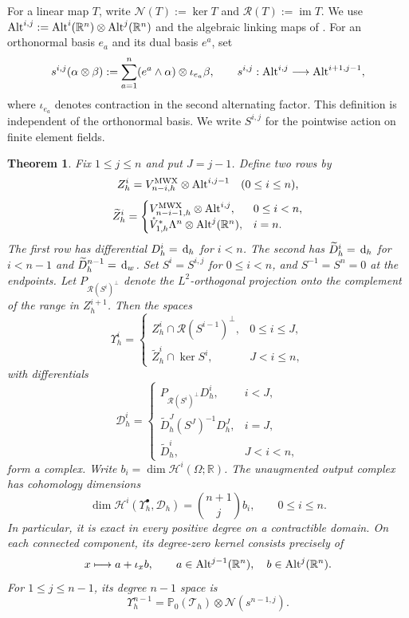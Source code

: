 \documentclass[10pt]{amsart}
\numberwithin{equation}{section}
\newtheorem{theorem}{Theorem}[section]
\newcommand{\dd}{\,{\rm d}}
\begin{document}
For a linear map $T$, write $\mathcal N(T):=\ker T$ and
$\mathcal R(T):=\operatorname{im}T$.
We use ${\rm Alt}^{i,j}:={\rm Alt}^i(\mathbb R^n)\otimes{\rm Alt}^j(\mathbb R^n)$ and the algebraic linking maps of \cite{ArnoldHu2021}.
For an orthonormal basis $e_a$ and its dual basis $e^a$, set
\[
s^{i,j}(\alpha\otimes\beta)
:=\sum_{a=1}^n(e^a\wedge\alpha)\otimes\iota_{e_a}\beta,
\qquad
s^{i,j}:{\rm Alt}^{i,j}\longrightarrow{\rm Alt}^{i+1,j-1},
\]
where $\iota_{e_a}$ denotes contraction in the second alternating factor.
This definition is independent of the orthonormal basis. We write $S^{i,j}$ for the pointwise action on finite element fields.

\begin{theorem}\label{thm:fullBGG}
Fix $1\leq j\leq n$ and put $J=j-1$. Define two rows by
\[
Z_h^i=V_{n-i,h}^{\rm MWX}\otimes{\rm Alt}^{i,j-1}
\quad(0\leq i\leq n),
\]
\[
\widetilde Z_h^i=
\begin{cases}
V_{n-i-1,h}^{\rm MWX}\otimes{\rm Alt}^{i,j},&0\leq i<n,\\
\mathring V_{1,h}^{*}\Lambda^n\otimes{\rm Alt}^j(\mathbb R^n),&i=n.
\end{cases}
\]
The first row has differential $D_h^i=\dd_h$ for $i<n$.
The second has $\widetilde D_h^i=\dd_h$ for $i<n-1$ and $\widetilde D_h^{n-1}=\dd_w$.
Set $S^i=S^{i,j}$ for $0\leq i<n$, and $S^{-1}=S^n=0$ at the endpoints.
Let $P_{\mathcal R(S^i)^\perp}$ denote the $L^2$-orthogonal projection onto the complement of the range in $Z_h^{i+1}$.
Then the spaces
\[
\Upsilon_h^i=
\begin{cases}
Z_h^i\cap\mathcal R(S^{i-1})^\perp,&0\leq i\leq J,\\
\widetilde Z_h^i\cap\ker S^i,&J<i\leq n,
\end{cases}
\]
with differentials
\[
\mathcal D_h^i=
\begin{cases}
P_{\mathcal R(S^i)^\perp}D_h^i,&i<J,\\
\widetilde D_h^J(S^J)^{-1}D_h^J,&i=J,\\
\widetilde D_h^i,&J<i<n,
\end{cases}
\]
form a complex. Write $b_i=\dim \mathscr H^i(\Omega;\mathbb R)$. The unaugmented
output complex has cohomology dimensions
\begin{equation}\label{eq:fullBGGcohomology}
\dim \mathscr H^i(\Upsilon_h^\bullet,\mathcal D_h)
=\binom{n+1}{j}b_i,\qquad 0\leq i\leq n.
\end{equation}
In particular, it is exact in every positive degree on a contractible domain.
On each connected component, its degree-zero kernel consists precisely of
\begin{equation}\label{eq:fullBGGkernel}
x\longmapsto a+\iota_xb,\qquad
 a\in{\rm Alt}^{j-1}(\mathbb R^n),\quad b\in{\rm Alt}^j(\mathbb R^n).
\end{equation}
For $1\leq j\leq n-1$, its degree $n-1$ space is
\[
\Upsilon_h^{n-1}
=\mathbb P_0(\mathcal T_h)\otimes\mathcal N(s^{n-1,j}).
\]
\end{theorem}
\end{document}
